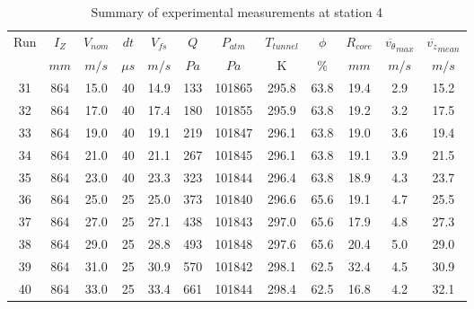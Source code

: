 \begin{table}[H]
\begin{center}
\begin{tabular}{|cccccccccccc|}
	\hline
	Run & $I_Z$ & $V_{nom}$ & $dt$ & $V_{fs}$ & $Q$ & $P_{atm}$ & $T_{tunnel}$ & $\phi$ & $R_{core}$ & $\overline{v_{\theta}}_{max}$ & $\overline{v_{z}}_{mean}$\\
	  & $mm$ & $m/s$ & $\mu s$ & $m/s$ & $Pa$ & $Pa$ & K & $\%$ & $mm$ & $m/s$ & $m/s$\\
	\hline
	31 & 864 & 15.0 & 40 & 14.9 & 133 & 101865 & 295.8 & 63.8 & 19.4 & 2.9 & 15.2\\
	32 & 864 & 17.0 & 40 & 17.4 & 180 & 101855 & 295.9 & 63.8 & 19.2 & 3.2 & 17.5\\
	33 & 864 & 19.0 & 40 & 19.1 & 219 & 101847 & 296.1 & 63.8 & 19.0 & 3.6 & 19.4\\
	34 & 864 & 21.0 & 40 & 21.1 & 267 & 101845 & 296.1 & 63.8 & 19.1 & 3.9 & 21.5\\
	35 & 864 & 23.0 & 40 & 23.3 & 323 & 101844 & 296.4 & 63.8 & 18.9 & 4.3 & 23.7\\
	36 & 864 & 25.0 & 25 & 25.0 & 373 & 101840 & 296.6 & 65.6 & 19.1 & 4.7 & 25.5\\
	37 & 864 & 27.0 & 25 & 27.1 & 438 & 101843 & 297.0 & 65.6 & 17.9 & 4.8 & 27.3\\
	38 & 864 & 29.0 & 25 & 28.8 & 493 & 101848 & 297.6 & 65.6 & 20.4 & 5.0 & 29.0\\
	39 & 864 & 31.0 & 25 & 30.9 & 570 & 101842 & 298.1 & 62.5 & 32.4 & 4.5 & 30.9\\
	40 & 864 & 33.0 & 25 & 33.4 & 661 & 101844 & 298.4 & 62.5 & 16.8 & 4.2 & 32.1\\
	\hline
\end{tabular}
\caption{Summary of experimental measurements at station 4}
\label{table:experiment_results_4}
\end{center}
\end{table}

